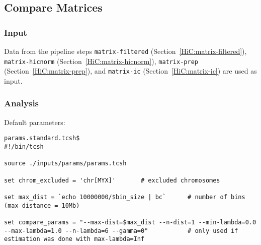 \subsection{Compare Matrices}\label{HiC:compare-matrices}%
\subsubsection{Input} %
Data from the pipeline steps %
\texttt{matrix-filtered} (Section~\ref{HiC:matrix-filtered}), \texttt{matrix-hicnorm} (Section~\ref{HiC:matrix-hicnorm}), \texttt{matrix-prep} (Section~\ref{HiC:matrix-prep}), and \texttt{matrix-ic} (Section~\ref{HiC:matrix-ic}) are used as input.
\subsubsection{Analysis} %
Default parameters:
\begin{lstlisting}
params.standard.tcsh$
#!/bin/tcsh

source ./inputs/params/params.tcsh

set chrom_excluded = 'chr[MYX]'       # excluded chromosomes

set max_dist = `echo 10000000/$bin_size | bc`      # number of bins (max distance = 10Mb)

set compare_params = "--max-dist=$max_dist --n-dist=1 --min-lambda=0.0 --max-lambda=1.0 --n-lambda=6 --gamma=0"           # only used if estimation was done with max-lambda=Inf
\end{lstlisting}
